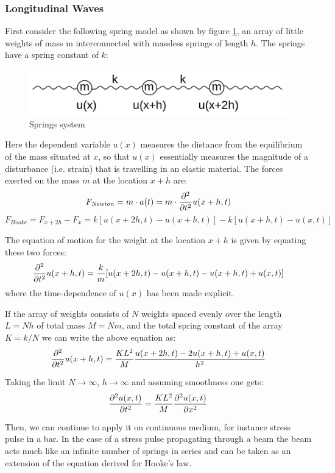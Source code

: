 \documentclass[openany]{book}
\begin{document}
\subsubsection{Longitudinal Waves}
First consider the following spring model as shown by figure \ref{fig:3}, an array of little weights of mass m interconnected with massless springs of length $h$. The springs have a spring constant of $k$:
\begin{figure}[H]
\centering
\includegraphics[scale=1]{Figure/3.PNG}
\caption{Springs system}
\label{fig:3}
\end{figure}
Here the dependent variable $u(x)$ measures the distance from the equilibrium of the mass situated at $x$, so that $u(x)$ essentially measures the magnitude of a disturbance (i.e. strain) that is travelling in an elastic material. The forces exerted on the mass $m$ at the location $x+h$ are:
\[F_{\mathit{Newton}}=m \cdot a(t)=m \cdot {{\partial^2 \over \partial t^2}u(x+h,t)}\]
\[F_\mathit{Hooke} = F_{x+2h} - F_x = k \left [ {u(x+2h,t) - u(x+h,t)} \right ] - k[u(x+h,t) - u(x,t)]\]

The equation of motion for the weight at the location $x+h$ is given by equating these two forces:
\[{\partial^2\over \partial t^2} u(x+h,t) = {k\over m}[u(x+2h,t)-u(x+h,t)-u(x+h,t)+u(x,t)]\]
where the time-dependence of $u(x)$ has been made explicit.

If the array of weights consists of $N$ weights spaced evenly over the length $L = Nh$ of total mass $M = Nm$, and the total spring constant of the array $K = k/N$ we can write the above equation as:
\[{\partial^2 \over \partial t^2} u(x+h,t)={KL^2 \over M}{u(x+2h,t)-2u(x+h,t)+u(x,t) \over h^2}\]

Taking the limit $N \to \infty$, $h \to \infty$ and assuming smoothness one gets:
\begin{equation}\label{eq:7}
{\partial^2 u(x,t) \over \partial t^2}={KL^2 \over M}{ \partial^2 u(x,t) \over \partial x^2 }
\end{equation}

Then, we can continue to apply it on continuous medium, for instance stress pulse in a bar. In the case of a stress pulse propagating through a beam the beam acts much like an infinite number of springs in series and can be taken as an extension of the equation derived for Hooke's law.
\end{document}
